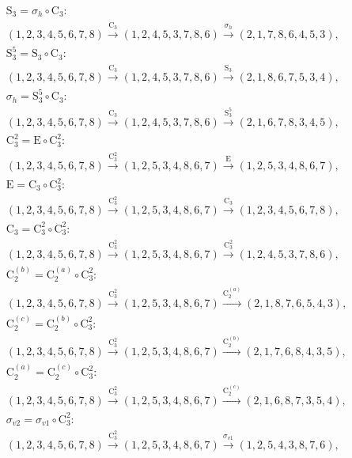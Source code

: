 \begin{align*}
& \mathrm{S}_{3} = \sigma_{h} \circ \mathrm{C}_{3}:\; \\& (1,2,3,4,5,6,7,8) \xrightarrow{\mathrm{C}_{3}} (1,2,4,5,3,7,8,6) \xrightarrow{\sigma_{h}} (2,1,7,8,6,4,5,3), \\
& \mathrm{S}_{3}^{5} = \mathrm{S}_{3} \circ \mathrm{C}_{3}:\; \\& (1,2,3,4,5,6,7,8) \xrightarrow{\mathrm{C}_{3}} (1,2,4,5,3,7,8,6) \xrightarrow{\mathrm{S}_{3}} (2,1,8,6,7,5,3,4), \\
& \sigma_{h} = \mathrm{S}_{3}^{5} \circ \mathrm{C}_{3}:\; \\& (1,2,3,4,5,6,7,8) \xrightarrow{\mathrm{C}_{3}} (1,2,4,5,3,7,8,6) \xrightarrow{\mathrm{S}_{3}^{5}} (2,1,6,7,8,3,4,5), \\
& \mathrm{C}_{3}^{2} = \mathrm{E} \circ \mathrm{C}_{3}^{2}:\; \\& (1,2,3,4,5,6,7,8) \xrightarrow{\mathrm{C}_{3}^{2}} (1,2,5,3,4,8,6,7) \xrightarrow{\mathrm{E}} (1,2,5,3,4,8,6,7), \\
& \mathrm{E} = \mathrm{C}_{3} \circ \mathrm{C}_{3}^{2}:\; \\& (1,2,3,4,5,6,7,8) \xrightarrow{\mathrm{C}_{3}^{2}} (1,2,5,3,4,8,6,7) \xrightarrow{\mathrm{C}_{3}} (1,2,3,4,5,6,7,8), \\
& \mathrm{C}_{3} = \mathrm{C}_{3}^{2} \circ \mathrm{C}_{3}^{2}:\; \\& (1,2,3,4,5,6,7,8) \xrightarrow{\mathrm{C}_{3}^{2}} (1,2,5,3,4,8,6,7) \xrightarrow{\mathrm{C}_{3}^{2}} (1,2,4,5,3,7,8,6), \\
& \mathrm{C}_{2}^{(b)} = \mathrm{C}_{2}^{(a)} \circ \mathrm{C}_{3}^{2}:\; \\& (1,2,3,4,5,6,7,8) \xrightarrow{\mathrm{C}_{3}^{2}} (1,2,5,3,4,8,6,7) \xrightarrow{\mathrm{C}_{2}^{(a)}} (2,1,8,7,6,5,4,3), \\
& \mathrm{C}_{2}^{(c)} = \mathrm{C}_{2}^{(b)} \circ \mathrm{C}_{3}^{2}:\; \\& (1,2,3,4,5,6,7,8) \xrightarrow{\mathrm{C}_{3}^{2}} (1,2,5,3,4,8,6,7) \xrightarrow{\mathrm{C}_{2}^{(b)}} (2,1,7,6,8,4,3,5), \\
& \mathrm{C}_{2}^{(a)} = \mathrm{C}_{2}^{(c)} \circ \mathrm{C}_{3}^{2}:\; \\& (1,2,3,4,5,6,7,8) \xrightarrow{\mathrm{C}_{3}^{2}} (1,2,5,3,4,8,6,7) \xrightarrow{\mathrm{C}_{2}^{(c)}} (2,1,6,8,7,3,5,4), \\
& \sigma_{v2} = \sigma_{v1} \circ \mathrm{C}_{3}^{2}:\; \\& (1,2,3,4,5,6,7,8) \xrightarrow{\mathrm{C}_{3}^{2}} (1,2,5,3,4,8,6,7) \xrightarrow{\sigma_{v1}} (1,2,5,4,3,8,7,6), \\

\end{align*}
